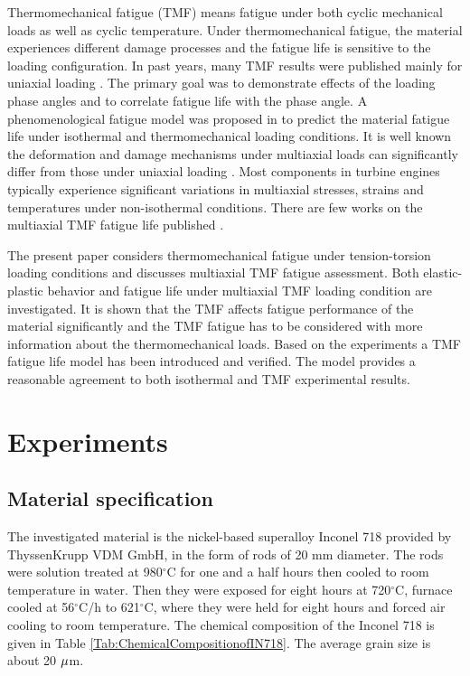 \documentclass[preprint,5p,twocolumn,11pt,sort&compress]{elsarticle}
\begin{document}
Thermomechanical fatigue (TMF) means fatigue under both cyclic mechanical loads as well as cyclic temperature. Under thermomechanical fatigue, the material experiences different damage processes and the fatigue life is sensitive to the loading configuration. In past years, many TMF results were published mainly for uniaxial loading \cite{Evans2008, Kulawinski2015, Remy2003, Bauer2009}. The primary goal was to demonstrate effects of the loading phase angles and to correlate fatigue life with the phase angle. A phenomenological fatigue model was proposed in \cite{Vose2013} to predict the material fatigue life under isothermal and thermomechanical loading conditions. It is well known the deformation and damage mechanisms under multiaxial loads can significantly differ from those under uniaxial loading \cite{Fang2015, Kang2004, Chen2004}. Most components in turbine engines typically experience significant variations in multiaxial stresses, strains and temperatures under non-isothermal conditions. There are few works on the multiaxial TMF fatigue life published \cite{Brookes2010}.

The present paper considers thermomechanical fatigue under tension-torsion loading conditions and discusses multiaxial TMF fatigue assessment. Both elastic-plastic behavior and fatigue life under multiaxial TMF loading condition are investigated. It is shown that the TMF affects fatigue performance of the material significantly and the TMF fatigue has to be considered with more information about the thermomechanical loads. Based on the experiments a TMF fatigue life model has been introduced and verified. The model provides a reasonable agreement to both isothermal and TMF experimental results.

\section{Experiments}
\subsection{Material specification}
The investigated material is the nickel-based superalloy Inconel 718 provided by ThyssenKrupp VDM GmbH, in the form of rods of 20 mm diameter.
The rods were solution treated at 980$^{\circ}$C for one and a half hours then cooled to room temperature in water.
Then they were exposed for eight hours at 720$^{\circ}$C, furnace cooled at 56$^{\circ}$C/h to 621$^{\circ}$C, where they were held for eight hours and forced air cooling to room temperature.
The chemical composition of the Inconel 718 is given in Table \ref{Tab:ChemicalCompositionofIN718}.
The average grain size is about 20 $\rm{\mu }$m.
\end{document}
